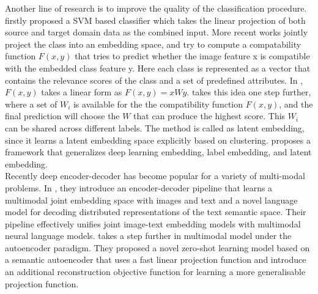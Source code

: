 \documentclass{article}
\newcommand{\bb}[1]{\boldsymbol{#1}}
\begin{document}
	Another line of research is to improve the quality of the classification procedure. \cite{hariharan2012efficient} firstly proposed a SVM based classifier which takes the linear projection of both source and target domain data as the combined input. More recent works jointly project the class into an embedding space, and try to compute a compatability function $F(x, y)$ that tries to predict whether the image feature x is compatible with the embedded class feature y. Here each class is represented as a vector that contains the relevance scores of the class and a set of predefined attributes.  In \cite{akata2013label}, $F(x, y)$ takes a linear form as $F(x, y) = xWy$. \cite{xian2016latent} takes this idea one step further, where a set of $W_i$ is available for the the compatibility function $F(x, y)$, and the final prediction will choose the $W$ that can produce the highest score. This $W_i$ can be shared across different labels.  The method is called as latent embedding, since it learns a latent embedding space explicitly based on clustering. \cite{zhang2016zero} proposes a framework that generalizes deep learning embedding, label embedding, and latent embedding. \\ 
    
    Recently deep encoder-decoder has become popular for a variety of multi-modal problems. In \cite{kiros2014unifying}, they introduce an encoder-decoder pipeline that learns a multimodal joint embedding space with images and text and a novel language model for decoding distributed representations of the text semantic space. Their pipeline effectively unifies joint image-text embedding models with multimodal neural language models. \cite{kodirov2017semantic} takes a step further in multimodal model under the autoencoder paradigm. They proposed a novel zero-shot learning model based on a semantic autoencoder that uses a fast linear projection function and introduce an additional reconstruction objective function for learning a more generalisable projection function. \\ 


	
\end{document}
